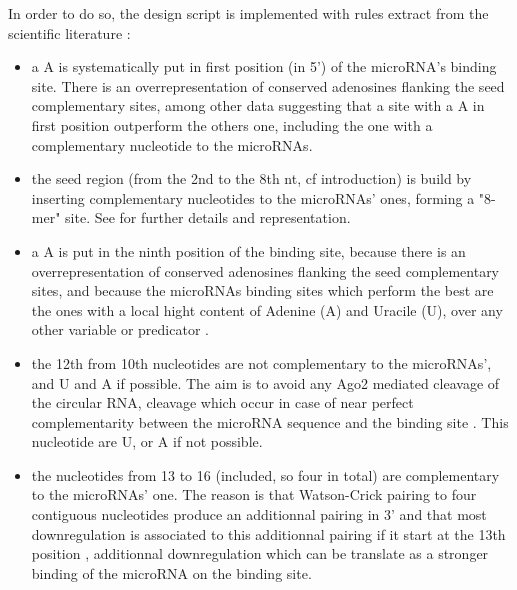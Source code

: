 \documentclass[a4paper,12pt]{report}
\begin{document}
In order to do so, the design script is implemented with rules extract from the scientific literature :

\begin{itemize}
\item a A is systematically put in first position (in 5') of the microRNA's binding site. There is an overrepresentation of conserved adenosines flanking the seed complementary sites\cite{Aanchor}, among other data suggesting that a site with a A in first position outperform the others one, including the one with a complementary nucleotide to the microRNAs\cite{Urich}. 

\item the seed region (from the 2nd to the 8th nt, cf introduction) is build by inserting complementary nucleotides to the microRNAs' ones, forming a "8-mer" site. See \cite{Urich, site} for further details and representation.

\item a A is put in the ninth position of the binding site, because there is an overrepresentation of conserved adenosines flanking the seed complementary sites\cite{Aanchor}, and because the microRNAs binding sites which perform the best are the ones with a local hight content of Adenine (A) and Uracile (U), over any other variable or predicator \cite{Urich}.

\item the 12th from 10th nucleotides are not complementary to the microRNAs', and U and A if possible. The aim is to avoid any Ago2 mediated cleavage of the circular RNA, cleavage which occur in case of near perfect complementarity between the microRNA sequence and the binding site \cite{cancer}. This nucleotide are U, or A if not possible.

\item the nucleotides from 13 to 16 (included, so four in total) are complementary to the \-microRNAs' one. The reason is that Watson-Crick pairing to four contiguous nucleotides produce an additionnal pairing in 3'\cite{site} and that most downregulation is associated to this additionnal pairing if it start at the 13th position \cite{site}, additionnal downregulation which can be translate as a stronger binding of the microRNA on the binding site\cite{site}.
		
	\end{itemize}
\end{document}
